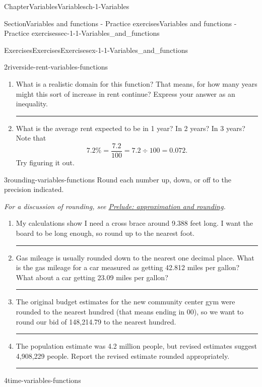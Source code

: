 \documentclass[twoside,11pt,]{book}
\newlength{\workspacestrutwidth}
\numberwithin{equation}{section}
\begin{document}
\begin{chapterptx}{Chapter}{Variables}{}{Variables}{}{}{ch-1-Variables}
\begin{sectionptx}{Section}{Variables and functions - Practice exercises}{}{Variables and functions - Practice exercises}{}{}{sec-1-1-Variables_and_functions}
\begin{exercises-subsection-numberless}{Exercises}{Exercises}{}{Exercises}{}{}{ex-1-1-Variables_and_functions}
\begin{divisionexercise}{2}{}{}{riverside-rent-variables-functions}
\begin{enumerate}[label=(\alph*),ref=\alph*]
\par\rule{\workspacestrutwidth}{1in}%
\item{}What is a realistic domain for this function? That means, for how many years might this sort of increase in rent continue? Express your answer as an inequality.%
\par\rule{\workspacestrutwidth}{1in}%
\item{}What is the average rent expected to be in 1 year? In 2 years? In 3 years? Note that%
\begin{equation*}
7.2\% = \frac{7.2}{100} = 7.2 \div 100 = 0.072\text{.}
\end{equation*}
Try figuring it out.%
\end{enumerate}%
\end{divisionexercise}%
\clearpage
\begin{divisionexercise}{3}{}{}{rounding-variables-functions}%
Round each number up, down, or off to the precision indicated.%
 \par
\emph{For a discussion of rounding, see \hyperref[sec-0-1-Approximation_and_rounding]{Prelude: approximation and rounding}.}%
\begin{enumerate}[label=(\alph*),ref=\alph*]%
\item{}My calculations show I need a cross brace around 9.388 feet long. I want the board to be long enough, so round up to the nearest foot.%
\par\rule{\workspacestrutwidth}{1.3in}%
\item{}Gas mileage is usually rounded down to the nearest one decimal place. What is the gas mileage for a car measured as getting 42.812 miles per gallon? What about a car getting 23.09 miles per gallon?%
\par\rule{\workspacestrutwidth}{1.3in}%
\item{}The original budget estimates for the new community center gym were rounded to the nearest hundred (that means ending in 00), so we want to round our bid of \textdollar{}148,214.79 to the nearest hundred.%
\par\rule{\workspacestrutwidth}{1.3in}%
\item{}The population estimate was 4.2 million people, but revised estimates suggest 4,908,229 people. Report the revised estimate rounded appropriately.%
\par\rule{\workspacestrutwidth}{1.3in}%
\end{enumerate}%
\end{divisionexercise}%
\clearpage
\begin{divisionexercise}{4}{}{}{time-variables-functions}%

\end{divisionexercise}
\end{exercises-subsection-numberless}
\end{sectionptx}
\end{chapterptx}
\end{document}
